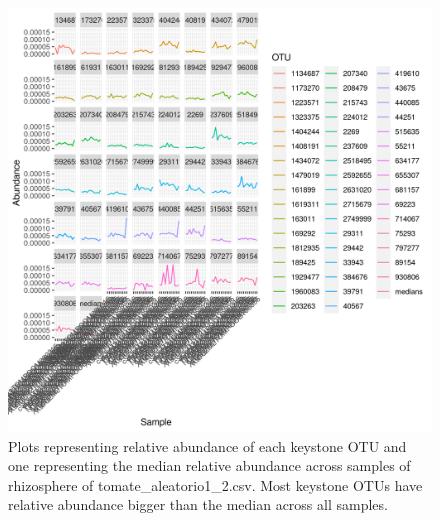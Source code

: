\begin{figure}
   \centering
   \includegraphics[scale = 0.8]{abundance_tomate_aleatorio1_2.csv_key_otus_medians.png}
   \caption{Plots representing relative abundance of each keystone OTU and one representing the median relative abundance  across samples of rhizosphere of tomate_aleatorio1_2.csv. Most keystone OTUs have relative abundance bigger than the median across all samples.  }
   \label{key_otus_vs_medians_tomate_aleatorio1_2.csv}
\end{figure}
